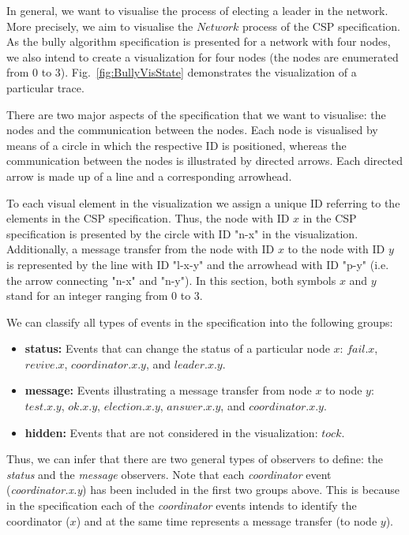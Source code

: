 In general, we want to visualise the process of electing a leader in the network.
More precisely, we aim to visualise the $Network$ process of the CSP specification.
As the bully algorithm specification is presented for a network with four nodes, we also intend to create a visualization for four nodes (the nodes are enumerated from 0 to 3). 
Fig.~\ref{fig:BullyVisState} demonstrates the visualization of a particular trace.

There are two major aspects of the specification that we want to visualise: the nodes and the communication between the nodes.
Each node is visualised by means of a circle in which the respective ID is positioned, whereas the communication between the nodes is illustrated by directed arrows.
Each directed arrow is made up of a line and a corresponding arrowhead.

To each visual element in the visualization we assign a unique ID referring to the elements in the CSP specification.
Thus, the node with ID $x$ in the CSP specification is presented by the circle with ID "n-x" in the visualization.
Additionally, a message transfer from the node with ID $x$ to the node with ID $y$ is represented by the line with ID "l-x-y" and the arrowhead with ID "p-y" (i.e. the arrow connecting "n-x" and "n-y").
In this section, both symbols $x$ and $y$ stand for an integer ranging from 0 to 3.

We can classify all types of events in the specification into the following groups:
\begin{itemize}
\item \textbf{status:} Events that can change the status of a particular node $x$: $fail.x$, $revive.x$, $coordinator.x.y$, and $leader.x.y$.
\item \textbf{message:} Events illustrating a message transfer from node $x$ to node $y$: $test.x.y$, $ok.x.y$, $election.x.y$, $answer.x.y$, and $coordinator.x.y$.
\item \textbf{hidden:} Events that are not considered in the visualization: $tock$.
\end{itemize}
Thus, we can infer that there are two general types of observers to define: the \textit{status} and the \textit{message} observers.
Note that each \textit{coordinator} event (\textit{coordinator.x.y}) has been included in the first two groups above. 
This is because in the specification each of the \textit{coordinator} events intends to identify the coordinator ($x$) and at the same time represents a message transfer (to node $y$).

